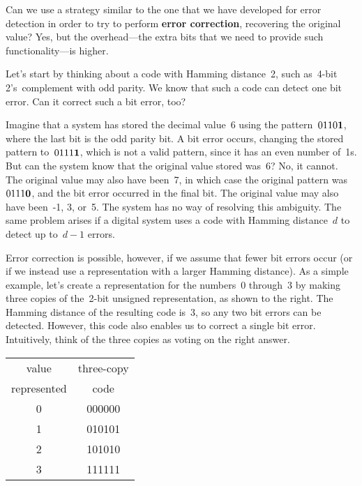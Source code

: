 Can we use a strategy similar to the one that we have developed for error
detection in order to try to perform {\bf error correction}, recovering
the original value?  Yes, but the overhead---the
extra bits that we need to provide such functionality---is higher.

\pagebreak

Let's start by thinking about a code with Hamming distance~2, such
as~\mbox{4-bit} 2's~complement with odd parity.  We know that such a 
code can detect one bit error.  Can it correct such a bit error, too?

Imagine that a system has stored the decimal value~6 using the 
pattern~$0110{\bf 1}$, where the last bit is the odd parity bit.
A bit error occurs, changing the stored pattern to~$0111{\bf 1}$, which is
not a valid pattern, since it has an even number of~1s.  But can the
system know that the original value stored was~6?  No, it cannot.
The original value may also have been~7, in which case the original
pattern was~$0111{\bf 0}$, and the bit error occurred in the final
bit.  The original value may also have been~-1, 3, or~5.  The system
has no way of resolving this ambiguity.
%
The same problem arises if a digital system uses a code with
Hamming distance~$d$ to detect up to~$d-1$ errors.\vspace{2pt}

\begin{minipage}{4.6in}
Error correction is possible, however, if we assume that fewer bit
errors occur (or if we instead use a representation with a larger Hamming
distance).
%
As a simple example, let's create a representation for the numbers~0
through~3 by making three copies of the~\mbox{2-bit} unsigned 
representation, as shown to the right.  The Hamming distance of the
resulting code is~3, so any two bit errors can be detected.  However,
this code also enables us to correct a single bit error.  Intuitively, 
think of the three copies as voting on the right answer.\linebreak\mpdone
\end{minipage}\hspace{.25in}%
\begin{minipage}{1.65in}
\begin{tabular}{c|c}
value      & three-copy\\
represented& code\\ \hline
0& 000000\\
1& 010101\\
2& 101010\\
3& 111111\\
\end{tabular}
\end{minipage}

